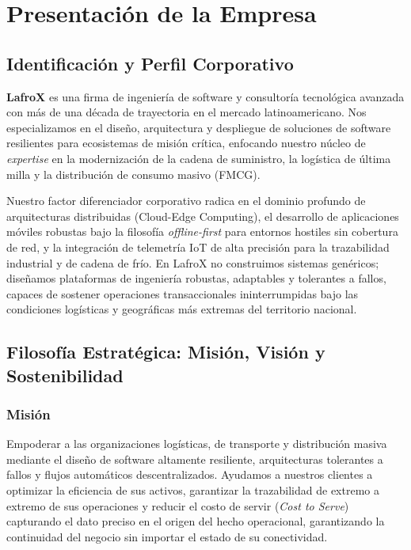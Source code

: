 \chapter{Presentación de la Empresa}
\label{sec:empresa}

\section{Identificación y Perfil Corporativo}

\textbf{LafroX} es una firma de ingeniería de software y consultoría tecnológica avanzada
con más de una década de trayectoria en el mercado latinoamericano. Nos especializamos en
el diseño, arquitectura y despliegue de soluciones de software resilientes para
ecosistemas de misión crítica, enfocando nuestro núcleo de \emph{expertise} en la
modernización de la cadena de suministro, la logística de última milla y la distribución
de consumo masivo (FMCG).

Nuestro factor diferenciador corporativo radica en el dominio profundo de arquitecturas
distribuidas (Cloud-Edge Computing), el desarrollo de aplicaciones móviles robustas bajo
la filosofía \emph{offline-first} para entornos hostiles sin cobertura de red, y la
integración de telemetría IoT de alta precisión para la trazabilidad industrial y de
cadena de frío. En LafroX no construimos sistemas genéricos; diseñamos plataformas de
ingeniería robustas, adaptables y tolerantes a fallos, capaces de sostener operaciones
transaccionales ininterrumpidas bajo las condiciones logísticas y geográficas más
extremas del territorio nacional.

\section{Filosofía Estratégica: Misión, Visión y Sostenibilidad}

\subsection{Misión}

Empoderar a las organizaciones logísticas, de transporte y distribución masiva mediante
el diseño de software altamente resiliente, arquitecturas tolerantes a fallos y flujos
automáticos descentralizados. Ayudamos a nuestros clientes a optimizar la eficiencia de
sus activos, garantizar la trazabilidad de extremo a extremo de sus operaciones y
reducir el costo de servir (\emph{Cost to Serve}) capturando el dato preciso en el
origen del hecho operacional, garantizando la continuidad del negocio sin importar el
estado de su conectividad.

